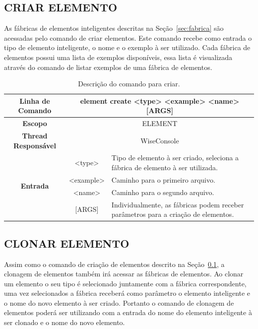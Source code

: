 \subsection{CRIAR ELEMENTO}\label{sec:create_element}

As fábricas de elementos inteligentes descritas na Seção~\ref{sec:fabrica} são acessadas pelo comando de criar elementos. Este comando recebe como entrada o tipo de elemento inteligente, o nome e o exemplo à ser utilizado. Cada fábrica de elementos possui uma lista de exemplos disponíveis, essa lista é visualizada através do comando de listar exemplos de uma fábrica de elementos.

\begin{center}
	\begin{table}[!htbp]
		\begin{tabularx}{\textwidth}{c|c|X}
			\toprule
			\textbf{Linha de Comando} & \multicolumn{2}{c}{element create <type> <example> <name> [ARGS]} \\
			\midrule
			\textbf{Escopo} & \multicolumn{2}{c}{ELEMENT} \\
			\hline
			\textbf{Thread Responsável} & \multicolumn{2}{c}{WiseConsole} \\
			\hline
			\multirow{4}{*}{\textbf{Entrada}} & <type> & Tipo de elemento à ser criado, seleciona a fábrica de elemento à ser utilizada. \\
			
			& <example> & Caminho para o primeiro arquivo. \\
			& <name> & Caminho para o segundo arquivo. \\
			& [ARGS] & Individualmente,  as fábricas podem receber parâmetros para a criação de elementos. \\
			\bottomrule
		\end{tabularx}
		\caption{Descrição do comando para criar.}
		\label{tab:create_element}
	\end{table}
\end{center}

\subsection{CLONAR ELEMENTO}\label{sec:clone_element}

Assim como o comando de criação de elementos descrito na Seção~\ref{sec:create_element}, a clonagem de elementos também irá acessar as fábricas de elementos. Ao clonar um elemento o seu tipo é selecionado juntamente com a fábrica correspondente, uma vez selecionados a fábrica receberá como parâmetro o elemento inteligente e o nome do novo elemento à ser criado. Portanto o comando de clonagem de elementos poderá ser utilizando com a entrada do nome do elemento inteligente à ser clonado e o nome do novo elemento.

